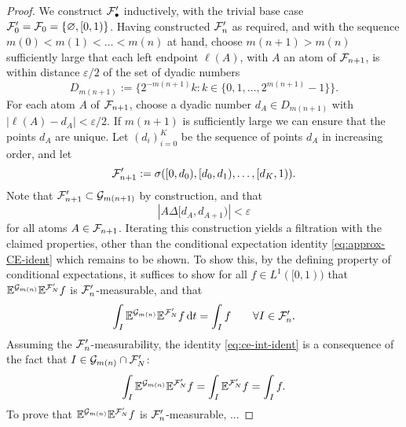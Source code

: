 
\begin{proof}
  We construct $\mathcal{F}'_{\bullet}$ inductively, with the trivial base case $\mathcal{F}'_{0} = \mathcal{F}_{0} = \{\varnothing, [0,1)\}$.
  Having constructed $\mathcal{F}'_{n}$ as required, and with the sequence $m(0) < m(1) < \ldots < m(n)$ at hand, choose $m(n+1) > m(n)$ sufficiently large that each left endpoint $\ell(A)$, with $A$ an atom of $\mathcal{F}_{n+1}$, is within distance $\varepsilon/2$ of the set of dyadic numbers
  \begin{equation*}
    D_{m(n+1)} := \{2^{-m(n+1)}k : k \in \{0,1,\ldots,2^{m(n+1)} - 1\}\}.
  \end{equation*}
  For each atom $A$ of $\mathcal{F}_{n+1}$, choose a dyadic number $d_{A} \in D_{m(n+1)}$ with $|\ell(A) - d_{A}| < \varepsilon/2$.
  If $m(n+1)$ is sufficiently large we can ensure that the points $d_{A}$ are unique.
  Let $(d_{i})_{i=0}^{K}$ be the sequence of points $d_{A}$ in increasing order, and let
  \begin{equation*}
    \mathcal{F}'_{n+1} := \sigma([0,d_{0}), [d_{0}, d_{1}), \ldots, [d_{K},1)).
  \end{equation*}
  Note that $\mathcal{F}'_{n+1} \subset \mathcal{G}_{m(n+1)}$ by construction, and that
  \begin{equation*}
    |A \Delta [d_{A}, d_{A+1})| < \varepsilon
  \end{equation*}
  for all atoms $A \in \mathcal{F}_{n+1}$.
  Iterating this construction yields a filtration with the claimed properties, other than the conditional expectation identity \eqref{eq:approx-CE-ident} which remains to be shown.
  To show this, by the defining property of conditional expectations, it suffices to show for all $f \in L^1([0,1))$ that $\mathbb{E}^{\mathcal{G}_{m(n)}} \mathbb{E}^{\mathcal{F}_{N}'} f$ is $\mathcal{F}_{n}'$-measurable, and that
  \begin{equation}\label{eq:ce-int-ident}
    \int_{I} \mathbb{E}^{\mathcal{G}_{m(n)}} \mathbb{E}^{\mathcal{F}_{N}'} f \, \mathrm{d} t = \int_{I} f \qquad \forall I \in \mathcal{F}_{n}'.
  \end{equation}
  Assuming the $\mathcal{F}_{n}'$-measurability, the identity \eqref{eq:ce-int-ident} is a consequence of the fact that $I \in \mathcal{G}_{m(n)} \cap \mathcal{F}_{N}'$:
  \begin{equation*}
    \begin{aligned}
      \int_{I} \mathbb{E}^{\mathcal{G}_{m(n)}} \mathbb{E}^{\mathcal{F}_{N}'} f
      = \int_{I} \mathbb{E}^{\mathcal{F}_{N}'} f
      = \int_{I} f.
    \end{aligned}
  \end{equation*}
  To prove that $\mathbb{E}^{\mathcal{G}_{m(n)}} \mathbb{E}^{\mathcal{F}_{N}'} f$ is $\mathcal{F}_{n}'$-measurable, ...
\end{proof}

